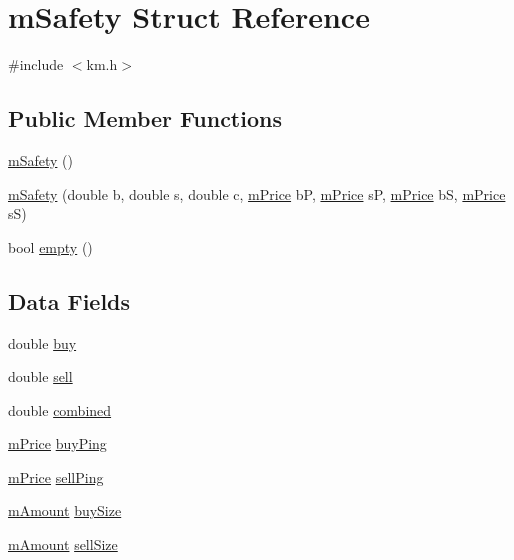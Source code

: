 \hypertarget{struct_k_1_1m_safety}{}\section{m\+Safety Struct Reference}
\label{struct_k_1_1m_safety}


{\ttfamily \#include $<$km.\+h$>$}

\subsection*{Public Member Functions}
\begin{DoxyCompactItemize}
\item 
\hyperlink{struct_k_1_1m_safety_a0dd8da0f9d855a1f90ae7e992d860975}{m\+Safety} ()
\item 
\hyperlink{struct_k_1_1m_safety_ad8ef77c7667df8d2f848d08d5ecb5044}{m\+Safety} (double b, double s, double c, \hyperlink{km_8h_a392f9b7f384aa3539bbb890b059f5b8c}{m\+Price} bP, \hyperlink{km_8h_a392f9b7f384aa3539bbb890b059f5b8c}{m\+Price} sP, \hyperlink{km_8h_a392f9b7f384aa3539bbb890b059f5b8c}{m\+Price} bS, \hyperlink{km_8h_a392f9b7f384aa3539bbb890b059f5b8c}{m\+Price} sS)
\item 
bool \hyperlink{struct_k_1_1m_safety_a3f37b042a1e7cd4bd38fc564de81f0da}{empty} ()
\end{DoxyCompactItemize}
\subsection*{Data Fields}
\begin{DoxyCompactItemize}
\item 
double \hyperlink{struct_k_1_1m_safety_a1afe90f27d7bdb4ff0f19e65657373bf}{buy}
\item 
double \hyperlink{struct_k_1_1m_safety_ac753cc5fd2db1d8b63e1727f8d98870a}{sell}
\item 
double \hyperlink{struct_k_1_1m_safety_a448af9123e47f20b47b8c2543c63d896}{combined}
\item 
\hyperlink{km_8h_a392f9b7f384aa3539bbb890b059f5b8c}{m\+Price} \hyperlink{struct_k_1_1m_safety_ae3a09b1f725944415947cb4d137a1db2}{buy\+Ping}
\item 
\hyperlink{km_8h_a392f9b7f384aa3539bbb890b059f5b8c}{m\+Price} \hyperlink{struct_k_1_1m_safety_a7069fdb29b101d36a39e9d69118360c2}{sell\+Ping}
\item 
\hyperlink{km_8h_ad4d00888c55a47a8a40ed8020d176086}{m\+Amount} \hyperlink{struct_k_1_1m_safety_a78713a07cb23439e664a091f740fef1f}{buy\+Size}
\item 
\hyperlink{km_8h_ad4d00888c55a47a8a40ed8020d176086}{m\+Amount} \hyperlink{struct_k_1_1m_safety_a4f82c0df812be2c3dc86ab0778b171d7}{sell\+Size}
\end{DoxyCompactItemize}


